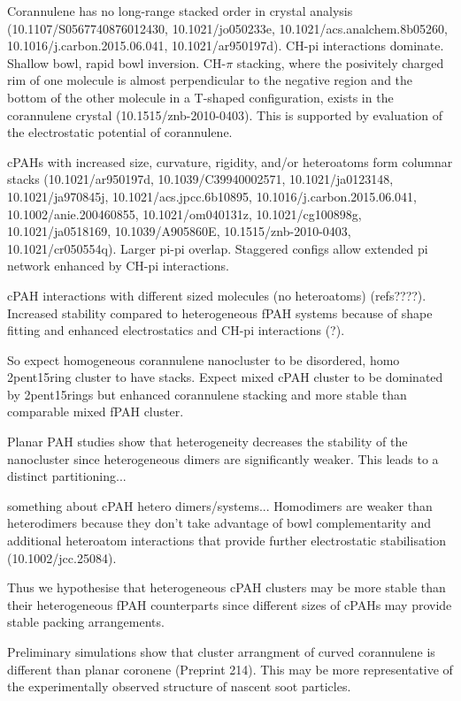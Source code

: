 Corannulene has no long-range stacked order in crystal analysis (10.1107/S0567740876012430, 10.1021/jo050233e, 10.1021/acs.analchem.8b05260, 10.1016/j.carbon.2015.06.041, 10.1021/ar950197d). CH-pi interactions dominate. Shallow bowl, rapid bowl inversion.
CH-$\pi$ stacking, where the posivitely charged rim of one molecule is almost perpendicular to the negative region and the bottom of the other molecule in a T-shaped configuration, exists in the corannulene crystal (10.1515/znb-2010-0403). This is supported by evaluation of the electrostatic potential of corannulene.

cPAHs with increased size, curvature, rigidity, and/or heteroatoms form columnar stacks (10.1021/ar950197d, 10.1039/C39940002571, 10.1021/ja0123148, 10.1021/ja970845j, 10.1021/acs.jpcc.6b10895, 10.1016/j.carbon.2015.06.041, 10.1002/anie.200460855, 10.1021/om040131z, 10.1021/cg100898g, 10.1021/ja0518169, 10.1039/A905860E, 10.1515/znb-2010-0403, 10.1021/cr050554q). Larger pi-pi overlap. Staggered configs allow extended pi network enhanced by CH-pi interactions.

cPAH interactions with different sized molecules (no heteroatoms) (refs????). Increased stability compared to heterogeneous fPAH systems because of shape fitting and enhanced electrostatics and CH-pi interactions (?).

So expect homogeneous corannulene nanocluster to be disordered, homo 2pent15ring cluster to have stacks. Expect mixed cPAH cluster to be dominated by 2pent15rings but enhanced corannulene stacking and more stable than comparable mixed fPAH cluster.


Planar PAH studies show that heterogeneity decreases the stability of the nanocluster since heterogeneous dimers are significantly weaker.  This leads to a distinct partitioning...

something about cPAH hetero dimers/systems...
Homodimers are weaker than heterodimers because they don't take advantage of bowl complementarity and additional heteroatom interactions that provide further electrostatic stabilisation (10.1002/jcc.25084).

Thus we hypothesise that heterogeneous cPAH clusters may be more stable than their heterogeneous fPAH counterparts since different sizes of cPAHs may provide stable packing arrangements.

Preliminary simulations show that cluster arrangment of curved corannulene is different than planar coronene (Preprint 214). This may be more representative of the experimentally observed structure of nascent soot particles.


